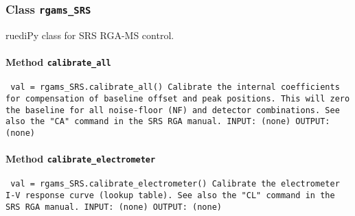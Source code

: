 
\subsubsection{Class \texttt{rgams_SRS}}
\par
ruediPy class for SRS RGA-MS control.\par

\paragraph{Method \texttt{calibrate_all}}
\vspace{1ex}
\texttt{\newline
val = rgams_SRS.calibrate_all()\newline
\newline
Calibrate the internal coefficients for compensation of baseline offset and peak positions. This will zero the baseline for all noise-floor (NF) and detector combinations. See also the "CA" command in the SRS RGA manual.\newline
\newline
INPUT:\newline
(none)\newline
\newline
OUTPUT:\newline
(none)\newline
\newline
}

\paragraph{Method \texttt{calibrate_electrometer}}
\vspace{1ex}
\texttt{\newline
val = rgams_SRS.calibrate_electrometer()\newline
\newline
Calibrate the electrometer I-V response curve (lookup table). See also the "CL" command in the SRS RGA manual.\newline
\newline
INPUT:\newline
(none)\newline
\newline
OUTPUT:\newline
(none)\newline
\newline
}

